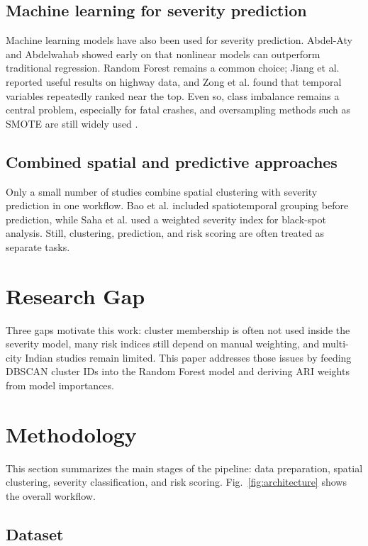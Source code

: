 \documentclass[conference]{IEEEtran}
\begin{document}
\subsection{Machine learning for severity prediction}

Machine learning models have also been used for severity prediction. Abdel-Aty and Abdelwahab \cite{b9} showed early on that nonlinear models can outperform traditional regression. Random Forest remains a common choice; Jiang et al. \cite{b10} reported useful results on highway data, and Zong et al. \cite{b11} found that temporal variables repeatedly ranked near the top. Even so, class imbalance remains a central problem, especially for fatal crashes, and oversampling methods such as SMOTE are still widely used \cite{b14}.

\subsection{Combined spatial and predictive approaches}

Only a small number of studies combine spatial clustering with severity prediction in one workflow. Bao et al. \cite{b16} included spatiotemporal grouping before prediction, while Saha et al. \cite{b18} used a weighted severity index for black-spot analysis. Still, clustering, prediction, and risk scoring are often treated as separate tasks.

\section{Research Gap}

Three gaps motivate this work: cluster membership is often not used inside the severity model, many risk indices still depend on manual weighting, and multi-city Indian studies remain limited. This paper addresses those issues by feeding DBSCAN cluster IDs into the Random Forest model and deriving ARI weights from model importances.

\section{Methodology}

This section summarizes the main stages of the pipeline: data preparation, spatial clustering, severity classification, and risk scoring. Fig.~\ref{fig:architecture} shows the overall workflow.

\subsection{Dataset}
\end{document}
